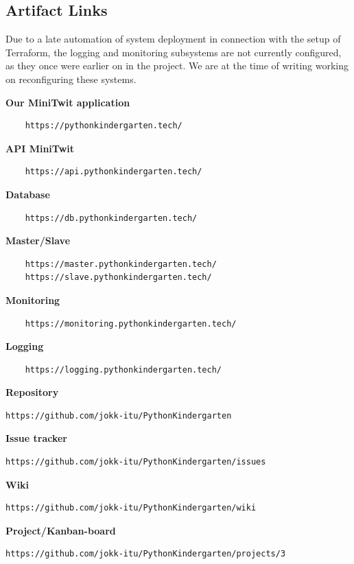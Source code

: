 \documentclass{article}
\begin{document}
\newpage
\subsection{Artifact Links}
Due to a late automation of system deployment in connection with the setup of Terraform, the logging and monitoring 
subsystems are not currently configured, as they once were earlier on in the project. We are at the time of writing working on reconfiguring these systems.

\textbf{Our MiniTwit application}
\begin{verbatim}
    https://pythonkindergarten.tech/
\end{verbatim}

\textbf{API MiniTwit}
\begin{verbatim}
    https://api.pythonkindergarten.tech/
\end{verbatim}

\textbf{Database}
\begin{verbatim}
    https://db.pythonkindergarten.tech/
\end{verbatim}

\textbf{Master/Slave}
\begin{verbatim}
    https://master.pythonkindergarten.tech/
    https://slave.pythonkindergarten.tech/
\end{verbatim}

\textbf{Monitoring}
\begin{verbatim}
    https://monitoring.pythonkindergarten.tech/
\end{verbatim}

\textbf{Logging}
\begin{verbatim}
    https://logging.pythonkindergarten.tech/
\end{verbatim}

\textbf{Repository}
\begin{verbatim}
https://github.com/jokk-itu/PythonKindergarten
\end{verbatim}

\textbf{Issue tracker}
\begin{verbatim}
https://github.com/jokk-itu/PythonKindergarten/issues
\end{verbatim}

\textbf{Wiki}
\begin{verbatim}
https://github.com/jokk-itu/PythonKindergarten/wiki
\end{verbatim}

\textbf{Project/Kanban-board}
\begin{verbatim}
https://github.com/jokk-itu/PythonKindergarten/projects/3
\end{verbatim}
\end{document}
